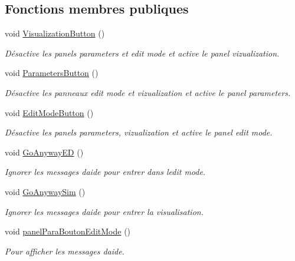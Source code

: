\subsection*{Fonctions membres publiques}
\begin{DoxyCompactItemize}
\item 
void \mbox{\hyperlink{class_navigation_ad4dbf103497aef10cc636c40f84dbdde}{Visualization\+Button}} ()
\begin{DoxyCompactList}\small\item\em Désactive les panels parameters et edit mode et active le panel vizualization. \end{DoxyCompactList}\item 
void \mbox{\hyperlink{class_navigation_adf000d0931e06c79e1e66f266d93e313}{Parameters\+Button}} ()
\begin{DoxyCompactList}\small\item\em Désactive les panneaux edit mode et vizualization et active le panel parameters. \end{DoxyCompactList}\item 
void \mbox{\hyperlink{class_navigation_af687f3df18da0e95175b04fe5cc7da56}{Edit\+Mode\+Button}} ()
\begin{DoxyCompactList}\small\item\em Désactive les panels parameters, vizualization et active le panel edit mode. \end{DoxyCompactList}\item 
void \mbox{\hyperlink{class_navigation_a17942535e76d66a1d290f9e7a2bc03ec}{Go\+Anyway\+ED}} ()
\begin{DoxyCompactList}\small\item\em Ignorer les messages d\textquotesingle{}aide pour entrer dans l\textquotesingle{}edit mode. \end{DoxyCompactList}\item 
void \mbox{\hyperlink{class_navigation_a4ea15dd4ea6a5789b4786150d534fc10}{Go\+Anyway\+Sim}} ()
\begin{DoxyCompactList}\small\item\em Ignorer les messages d\textquotesingle{}aide pour entrer la visualisation. \end{DoxyCompactList}\item 
void \mbox{\hyperlink{class_navigation_a9a7bb527269069e0c083ef70291d4fb3}{panel\+Para\+Bouton\+Edit\+Mode}} ()
\begin{DoxyCompactList}\small\item\em Pour afficher les messages d\textquotesingle{}aide. \end{DoxyCompactList}\item 

\end{DoxyCompactItemize}
